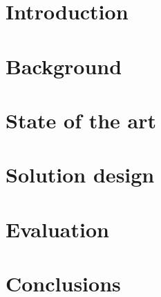 \documentclass{Configuration_Files/PoliMi3i_thesis}
\begin{document}
\mainmatter %

\chapter{Introduction}

\chapter{Background}

\chapter{State of the art}

\chapter{Solution design}\label{solutionDesign}

\chapter{Evaluation}

\chapter{Conclusions}





\cleardoublepage
{} %
\end{document}

